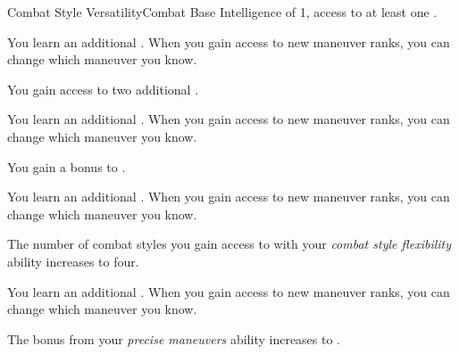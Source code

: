     \begin{feat}{Combat Style Versatility}{Combat}
        \featpre Base Intelligence of 1, access to at least one .

         You learn an additional .
        When you gain access to new maneuver ranks, you can change which maneuver you know.

         You gain access to two additional .

         You learn an additional .
        When you gain access to new maneuver ranks, you can change which maneuver you know.

         You gain a  bonus to .

         You learn an additional .
        When you gain access to new maneuver ranks, you can change which maneuver you know.

         The number of combat styles you gain access to with your \textit{combat style flexibility} ability increases to four.

         You learn an additional .
        When you gain access to new maneuver ranks, you can change which maneuver you know.

         The bonus from your \textit{precise maneuvers} ability increases to .
    \end{feat}

